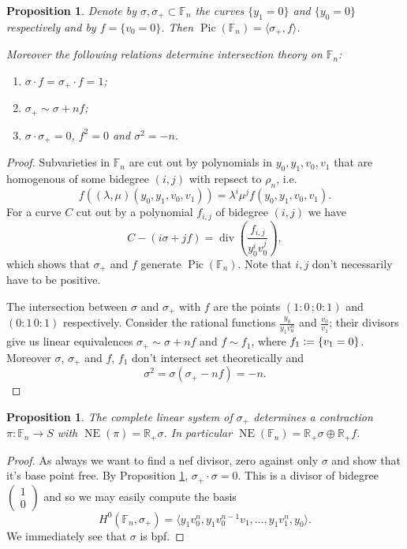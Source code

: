 \documentclass[a4paper,11pt]{amsart}
\newtheorem{proposition}[theorem]{Proposition}
\def\NE{\operatorname{NE}}
\def\Pic{\operatorname{Pic}}
\def\divv{\operatorname{div}}
\newcommand{\RR}{\mathbb{R}}
\renewcommand{\FF}{\mathbb{F}}
\newcommand{\defeq}{\vcentcolon=}
\begin{document}
\begin{proposition}\label{prop:intersectionFFn}
	Denote by $\sigma, \sigma_+ \subset \FF_n$ the curves $\{y_1 = 0\}$ and $\{y_0 = 0\}$ respectively and by $f = \{v_0=0\}$.
	Then $\Pic(\FF_n) = \langle \sigma_+, f \rangle$.
	
	Moreover the following relations determine intersection theory on $\FF_n$:
	\begin{enumerate}
		\item $\sigma \cdot f = \sigma_+\cdot f = 1$;
		\item $\sigma_+ \sim \sigma + nf$;
		\item $\sigma\cdot\sigma_+ = 0$, $f^2 =0$ and $\sigma^2 = -n$.
	\end{enumerate}
\end{proposition}

\begin{proof}
	Subvarieties in $\FF_n$ are cut out by polynomials in $y_0,y_1,v_0,v_1$ that are homogenous of some bidegree $(i,j)$ with repsect to $\rho_n$, i.e.\
	\[
	f((\lambda,\mu)(y_0,y_1,v_0,v_1)) = \lambda^i\mu^jf(y_0,y_1,v_0,v_1).
	\]
	For a curve $C$ cut out by a polynomial $f_{i,j}$ of bidegree $(i,j)$ we have
	\[
	C - (i\sigma  + j f) = \divv\left(\frac{f_{i,j}}{y_0^iv_0^j}\right),
	\]
	which shows that $\sigma_+$ and $f$ generate $\Pic(\FF_n)$.
	Note that $i,j$ don't necessarily have to be positive.
	
	The intersection between $\sigma$ and $\sigma_+$ with $f$ are the points $(1:0\,; 0:1)$ and $(0:1\, 0:1)$ respectively.
	Consider the rational functions $\frac{y_0}{y_1v_0^n}$ and $\frac{v_0}{v_1}$;
	their divisors give us linear equivalences $\sigma_+ \sim \sigma + n f$ and $f\sim f_1$, where $f_1 \defeq \{v_1=0\}$.
	Moreover $\sigma$, $\sigma_+$ and $f$, $f_1$ don't intersect set theoretically and
	\[
	\sigma^2 = \sigma (\sigma_+ - nf) = -n.
	\]
\end{proof}

\begin{proposition}\label{prop:contractionHirz}
	The complete linear system of $\sigma_+$ determines a contraction $\pi\colon \FF_n \to S$ with $\NE(\pi) = \RR_+\sigma$.
	In particular $\NE(\FF_n) = \RR_+ \sigma \oplus \RR_+f$.
\end{proposition}

\begin{proof}
	As always we want to find a nef divisor, zero against only $\sigma$ and show that it's base point free.
	By Proposition \ref{prop:intersectionFFn}, $\sigma_+\cdot \sigma = 0$.
	This is a divisor of bidegree $\left( \begin{smallmatrix}
		1 \\ 0
	\end{smallmatrix} \right)$ and so we may easily compute the basis
	\[
	H^0(\FF_n,\sigma_+) = \langle y_1v_0^n, y_1v_0^{n-1}v_1,\dots, y_1v_1^n, y_0 \rangle.
	\]
	We immediately see that $\sigma$ is bpf.
\end{proof}
\end{document}
